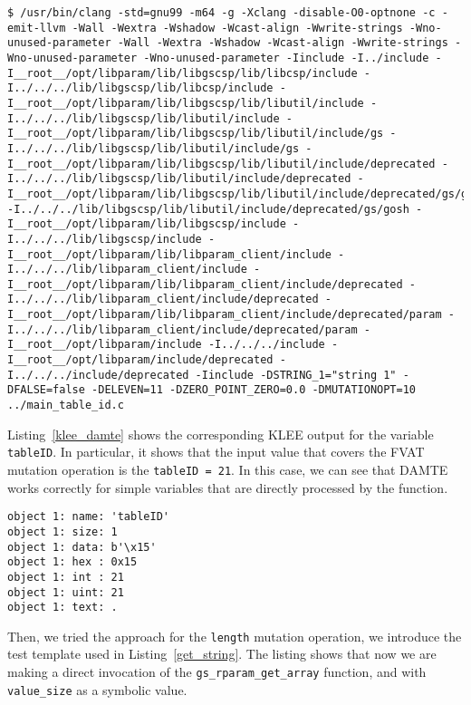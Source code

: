 \begin{lstlisting}[style=CStyle]
$ /usr/bin/clang -std=gnu99 -m64 -g -Xclang -disable-O0-optnone -c -emit-llvm -Wall -Wextra -Wshadow -Wcast-align -Wwrite-strings -Wno-unused-parameter -Wall -Wextra -Wshadow -Wcast-align -Wwrite-strings -Wno-unused-parameter -Wno-unused-parameter -Iinclude -I../include -I__root__/opt/libparam/lib/libgscsp/lib/libcsp/include -I../../../lib/libgscsp/lib/libcsp/include -I__root__/opt/libparam/lib/libgscsp/lib/libutil/include -I../../../lib/libgscsp/lib/libutil/include -I__root__/opt/libparam/lib/libgscsp/lib/libutil/include/gs -I../../../lib/libgscsp/lib/libutil/include/gs -I__root__/opt/libparam/lib/libgscsp/lib/libutil/include/deprecated -I../../../lib/libgscsp/lib/libutil/include/deprecated -I__root__/opt/libparam/lib/libgscsp/lib/libutil/include/deprecated/gs/gosh -I../../../lib/libgscsp/lib/libutil/include/deprecated/gs/gosh -I__root__/opt/libparam/lib/libgscsp/include -I../../../lib/libgscsp/include -I__root__/opt/libparam/lib/libparam_client/include -I../../../lib/libparam_client/include -I__root__/opt/libparam/lib/libparam_client/include/deprecated -I../../../lib/libparam_client/include/deprecated -I__root__/opt/libparam/lib/libparam_client/include/deprecated/param -I../../../lib/libparam_client/include/deprecated/param -I__root__/opt/libparam/include -I../../../include -I__root__/opt/libparam/include/deprecated -I../../../include/deprecated -Iinclude -DSTRING_1="string 1" -DFALSE=false -DELEVEN=11 -DZERO_POINT_ZERO=0.0 -DMUTATIONOPT=10 ../main_table_id.c
\end{lstlisting}

Listing~\ref{klee_damte} shows the corresponding KLEE output for the variable \texttt{tableID}. In particular, it shows that the input value that covers the FVAT mutation operation is the \texttt{tableID = 21}. In this case, we can see that DAMTE works correctly for simple variables that are directly processed by the function.

\begin{lstlisting}[style=CStyle,float=t, caption=KLEE output for the variable tableID., label=klee_damte]
object 1: name: 'tableID'
object 1: size: 1
object 1: data: b'\x15'
object 1: hex : 0x15
object 1: int : 21
object 1: uint: 21
object 1: text: .
\end{lstlisting}

Then, we tried the approach for the \texttt{length} mutation operation, we introduce the test template used in Listing~\ref{get_string}. The listing shows that now we are making a direct invocation of the \texttt{gs\_rparam\_get\_array} function, and with \texttt{value\_size} as a symbolic value.

